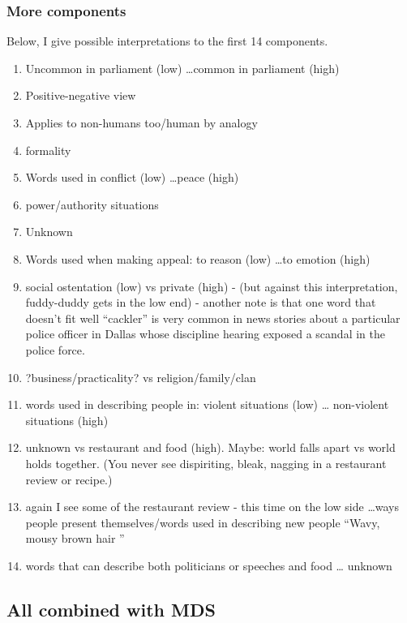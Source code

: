 \documentclass[10pt,letterpaper]{book}
\begin{document}
\subsubsection{More components}

Below, I give possible interpretations to the first 14 components.

\begin{enumerate}
 \item Uncommon in parliament (low) \ldots common in parliament (high)
 \item Positive-negative view
 \item Applies to non-humans too/human by analogy
 \item formality
 \item Words used in conflict (low) \ldots peace (high)
 \item power/authority situations
 \item Unknown
 \item Words used when making appeal: to reason (low) \ldots to emotion (high)
 \item social ostentation (low) vs private (high) - (but against this 
       interpretation, fuddy-duddy gets in the low end) - another note is that 
       one word that doesn't fit well ``cackler'' is very common in news 
       stories about a particular police officer in Dallas whose discipline 
       hearing exposed a scandal in the police force.
 \item ?business/practicality? vs religion/family/clan
 \item words used in describing people in: violent situations (low) \ldots 
       non-violent situations (high)
 \item unknown vs restaurant and food (high). Maybe: world falls apart vs world 
       holds together. (You never see dispiriting, bleak, nagging in a 
       restaurant review or recipe.)
 \item again I see some of the restaurant review - this time on the low side 
       \ldots ways people present themselves/words used in describing new 
       people ``Wavy, mousy brown hair ''
 \item words that can describe both politicians or speeches and food \ldots 
       unknown
\end{enumerate}

\subsection{All combined with MDS}
\end{document}
